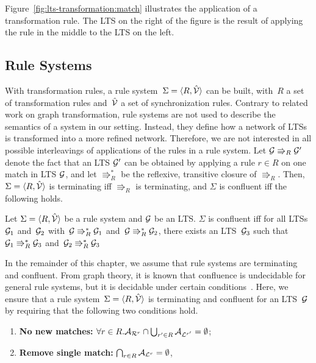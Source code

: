 Figure~\ref{fig:lts-transformation:match} illustrates the application of a transformation rule.
The LTS on the right of the figure is the result of applying the rule in the middle to the LTS on the left.

\subsection{Rule Systems}
With transformation rules, a rule system~$\Sigma = \langle R,\hat{{\mathcal{V}}} \rangle$ can be built, with~$R$ a set of transformation rules and~$\hat{{\mathcal{V}}}$ a set of synchronization rules.
Contrary to related work on graph transformation, rule systems are not used to describe the semantics of a system in our setting.
Instead, they define how a network of LTSs is transformed into a more refined network.
Therefore, we are not interested in all possible interleavings of applications of the rules in a rule system.
Let $\mathcal{G} \Rrightarrow_R \mathcal{G}'$ denote the fact that an LTS $\mathcal{G}'$ can be obtained by applying a rule $r \in R$ on one match in LTS $\mathcal{G}$, and let $\Rrightarrow_R^*$ be the reflexive, transitive closure of $\Rrightarrow_R$.
Then, $\Sigma = \langle R,\hat{{\mathcal{V}}} \rangle$ is terminating iff $\Rrightarrow_R$ is terminating, and $\Sigma$ is confluent iff the following holds.

\begin{definition}
\label{def:lts-transformation:confluence}
Let $\Sigma = \langle R,\hat{{\mathcal{V}}} \rangle$ be a rule system and $\mathcal{G}$ be an LTS. $\Sigma$ is confluent iff for all LTSs~$\mathcal{G}_1$ and~$\mathcal{G}_2$ with~$\mathcal{G} \Rrightarrow_R^* \mathcal{G}_1$ and~$\mathcal{G} \Rrightarrow_R^* \mathcal{G}_2$, there exists an LTS~$\mathcal{G}_3$ such that~$\mathcal{G}_1 \Rrightarrow_R^* \mathcal{G}_3$ and~$\mathcal{G}_2 \Rrightarrow_R^* \mathcal{G}_3$
\end{definition}

In the remainder of this chapter, we assume that rule systems are terminating and confluent.
From graph theory, it is known that confluence is undecidable for general rule systems, but it is decidable under certain conditions~\cite{lambers.conflicts,plump.confluence05}.
Here, we ensure that a rule system~$\Sigma = \langle R,\hat{{\mathcal{V}}} \rangle$ is terminating and confluent for an LTS~$\mathcal{G}$ by requiring that the following two conditions hold.

\begin{enumerate}
\item \textbf{No new matches:}
$\forall r \in R . {\mathcal{A}_{\mathcal{R}^r}} \cap \bigcup_{r' \in R} {\mathcal{A}_{\mathcal{L}^{r'}}} = \emptyset$;
\item \textbf{Remove single match:}
$\bigcap_{r \in R} {\mathcal{A}_{\mathcal{L}^{r}}} = \emptyset$,
\end{enumerate}

